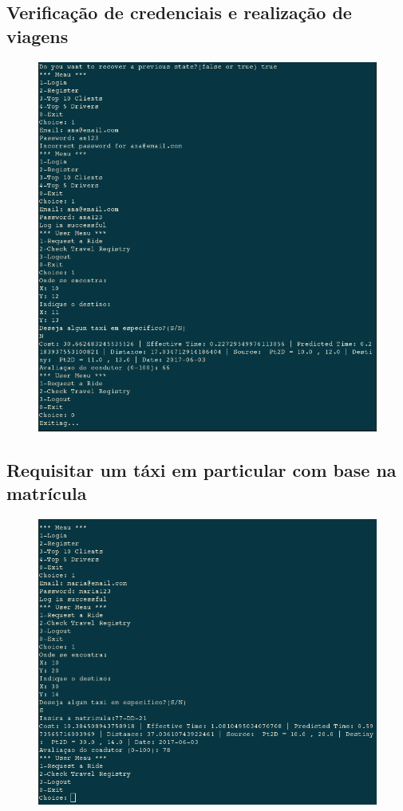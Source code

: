 \documentclass[a4paper,10pt,portuguese]{article}
\begin{document}
\subsection{Verificação de credenciais e realização de viagens}
\begin{figure}[H]
    \centering
    \includegraphics[width=120mm]{fazerViagem.png}
\end{figure}


\subsection{Requisitar um táxi em particular com base na matrícula}
\begin{figure}[H]
    \centering
    \includegraphics[width=120mm]{fazerViagemComMatricula.png}
\end{figure}
\end{document}
